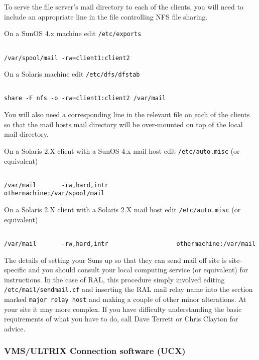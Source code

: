 To serve the file server's mail directory to each of the clients, you will
need to include an appropriate line in the file controlling NFS file
sharing.


On a SunOS 4.x machine edit {\tt /etc/exports}
\begin{verbatim}

/var/spool/mail -rw=client1:client2

\end{verbatim}

On a Solaris machine edit {\tt /etc/dfs/dfstab}
\begin{verbatim}

share -F nfs -o -rw=client1:client2 /var/mail

\end{verbatim}

You will also need a corresponding line in the relevant file
on each of the clients so that the mail hosts mail directory
will be over-mounted on top of the local mail directory.

On a Solaris 2.X client with a SunOS 4.x mail host edit {\tt /etc/auto.misc} (or
equivalent)
\begin{verbatim}

/var/mail       -rw,hard,intr                   othermachine:/var/spool/mail

\end{verbatim}

On a Solaris 2.X client with a Solaris 2.X mail host edit {\tt /etc/auto.misc} (or
equivalent)
\begin{verbatim}

/var/mail       -rw,hard,intr                   othermachine:/var/mail

\end{verbatim}


The details of setting your Suns up so that they can send mail off site
is site-specific and you should consult your local computing service
(or equivalent) for instructions. In the case of RAL, this procedure
simply involved editing \verb+/etc/mail/sendmail.cf+ and inserting
the RAL mail relay name into the section marked \verb+major relay host+
and making a couple of other minor alterations.
At your site it may more complex. If you have difficulty understanding
the basic requirements of what you have to do, call Dave Terrett
or Chris Clayton for advice.


\subsubsection{VMS/ULTRIX Connection software (UCX)}

